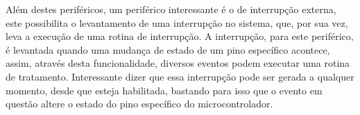 \begin{itemize}
\end{itemize}

Além destes periféricos, um periférico interessante é o de interrupção externa, este possibilita o levantamento de uma interrupção no sistema, que, por sua vez, leva a execução de uma rotina de interrupção. A interrupção, para este periférico, é levantada quando uma mudança de estado de um pino específico acontece, assim, através desta funcionalidade, diversos eventos podem executar uma rotina de tratamento. Interessante dizer que essa interrupção pode ser gerada a qualquer momento, desde que esteja habilitada, bastando para isso que o evento em questão altere o estado do pino específico do microcontrolador.